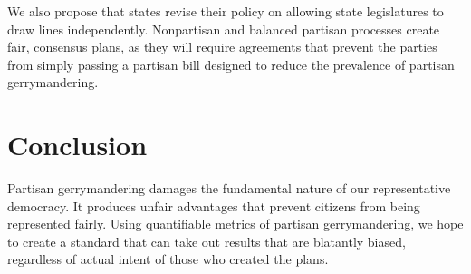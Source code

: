 \documentclass[12pt]{article}
\begin{document}
  We also propose that states revise their policy on allowing state legislatures to draw lines independently.  Nonpartisan and balanced partisan processes create fair, consensus plans, as they will require agreements that prevent the parties from simply passing a partisan bill designed to reduce the prevalence of partisan gerrymandering.  
  
  \section{Conclusion}
  Partisan gerrymandering damages the fundamental nature of our representative democracy.  It produces unfair advantages that prevent citizens from being represented fairly.  Using quantifiable metrics of partisan gerrymandering, we hope to create a standard that can take out results that are blatantly biased, regardless of actual intent of those who created the plans.

  
  \singlespacing{}

  \printbibliography{}
\end{document}
